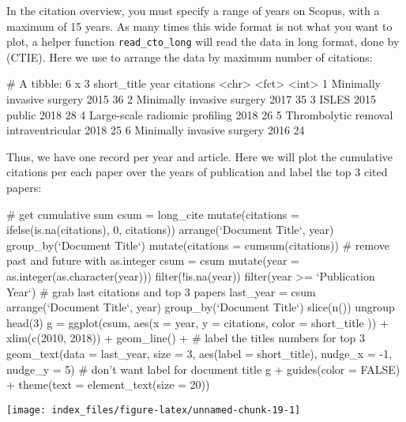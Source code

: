In the citation overview, you must specify a range of years on Scopus,
with a maximum of 15 years. As many times this wide format is not what
you want to plot, a helper function \texttt{read\_cto\_long} will read
the data in long format, done by  (CTIE). Here we use
 to arrange the data by maximum number of citations:

\begin{Schunk}
\begin{Soutput}
# A tibble: 6 x 3
  short_title                           year  citations
  <chr>                                 <fct>     <int>
1 Minimally invasive surgery            2015         36
2 Minimally invasive surgery            2017         35
3 ISLES 2015 public                     2018         28
4 Large-scale radiomic profiling        2018         26
5 Thrombolytic removal intraventricular 2018         25
6 Minimally invasive surgery            2016         24
\end{Soutput}
\end{Schunk}

Thus, we have one record per year and article. Here we will plot the
cumulative citations per each paper over the years of publication and
label the top 3 cited papers:

\begin{Schunk}
\begin{Sinput}
# get cumulative sum
csum = long_cite %>% 
  mutate(citations = ifelse(is.na(citations), 0, citations)) %>% 
  arrange(`Document Title`, year) %>% 
  group_by(`Document Title`) %>% 
  mutate(citations = cumsum(citations))
# remove past and future with as.integer
csum = csum %>% 
  mutate(year = as.integer(as.character(year))) %>% 
  filter(!is.na(year)) %>% 
  filter(year >= `Publication Year`)
# grab last citations and top 3 papers
last_year = csum %>% 
  arrange(`Document Title`, year) %>% 
  group_by(`Document Title`) %>% 
  slice(n()) %>% 
  ungroup %>% arrange(-citations) %>% 
  head(3) 
g = ggplot(csum, 
           aes(x = year, y = citations, color = short_title  )) +
  xlim(c(2010, 2018)) + geom_line() + 
  # label the titles numbers for top 3
  geom_text(data = last_year, size = 3, aes(label = short_title), 
            nudge_x = -1, nudge_y = 5)
# don't want label for document title
g + guides(color = FALSE) + theme(text = element_text(size = 20))
\end{Sinput}

\texttt{[image: index\_files/figure-latex/unnamed-chunk-19-1]} \end{Schunk}

